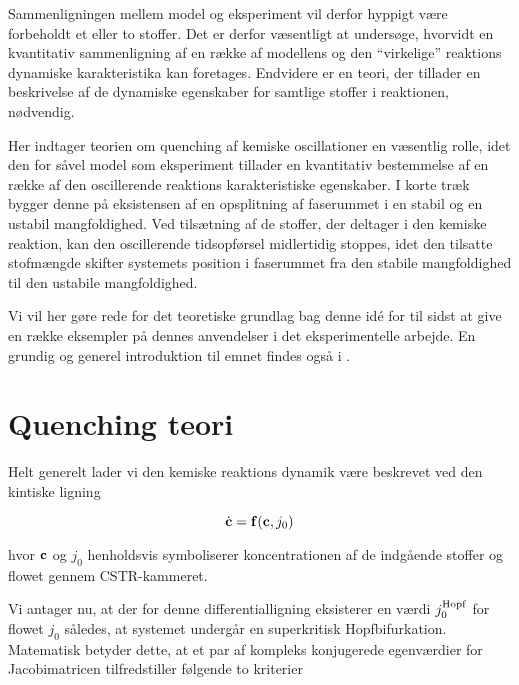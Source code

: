 \vspace{4.0mm}
Sammenligningen mellem model og eksperiment vil derfor
hyppigt v{\ae}re forbeholdt et eller to stoffer. Det er
derfor v{\ae}sentligt at unders{\o}ge, hvorvidt en
kvantitativ sammenligning af en r{\ae}kke af model\-lens og
den ``virkelige'' reaktions dynamiske karakteristika kan
foretages. Endvidere er en teori, der tillader en
beskrivelse af de dynamiske egenskaber for samtlige stoffer
i reaktionen, n{\o}dvendig.

\vspace{4.0mm}
Her indtager teorien om quenching af kemiske oscillationer
en v{\ae}sentlig rolle, idet den for s{\aa}vel model som
eksperiment tillader en kvantitativ bestemmelse af en
r{\ae}kke af den oscillerende reaktions karakteristiske
egenskaber. I korte tr{\ae}k bygger denne p{\aa}
eksistensen af en opsplitning af faserummet i en stabil og
en ustabil mangfoldighed. Ved tils{\ae}tning af de stoffer,
der deltager i den kemiske reaktion, kan den oscillerende
tidsopf{\o}rsel midlertidig stoppes, idet den tilsatte
stofm{\ae}ngde skifter systemets position i faserummet fra
den stabile mangfoldighed til den ustabile mangfoldighed.

\vspace{4.0mm}
Vi vil her g{\o}re rede for det teoretiske grundlag bag
denne id\'{e} for til sidst at give en r{\ae}kke eksempler
p{\aa} dennes anvendelser i det eksperimentelle arbejde. En
grundig og generel introduktion til emnet findes ogs{\aa} i
\cite{GenQuench}.

\section{Quenching teori}
Helt generelt lader vi den kemiske reaktions dynamik
v{\ae}re beskrevet ved den kintiske ligning

\begin{equation}
 \dot{\bf c} = {\bf f}({\bf c},j_0)
 \label{eq:GeneralKinetic}
\end{equation}

hvor ${\bf c}$ og $j_0$ henholdsvis symboliserer
koncentrationen af de indg{\aa}ende stoffer og flowet
gennem CSTR-kammeret.

\vfill
\vspace{4.0mm} 
Vi antager nu, at der for denne differentialligning
eksisterer en v{\ae}rdi $j_0^{\rm Hopf}$ for flowet $j_0$
s{\aa}ledes, at systemet underg{\aa}r en superkritisk
Hopfbifurkation. Matematisk betyder dette, at et par af
kompleks konjugerede egenv{\ae}rdier for Jacobimatricen
tilfredstiller f{\o}lgende to kriterier

